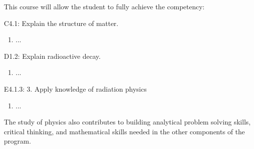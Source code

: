 {This course will allow the student to fully achieve the competency:

C4.1: Explain the structure of matter.
\begin{enumerate}
\item ...
\end{enumerate}

D1.2: Explain radioactive decay.
\begin{enumerate}
\item ...
\end{enumerate}

E4.1.3: 3.	Apply knowledge of radiation physics
\begin{enumerate}
\item ...
\end{enumerate}

The study of physics also contributes to building analytical problem solving skills, critical thinking, and mathematical skills needed in the other components of the program.
}